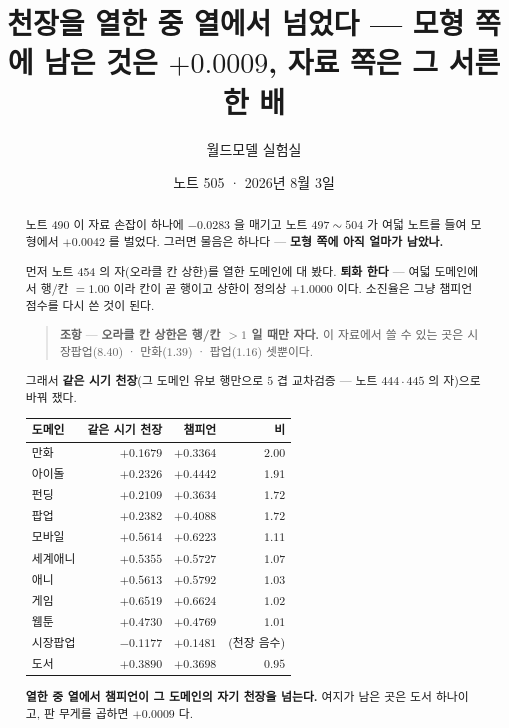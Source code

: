 \documentclass[11pt]{article}
\begin{document}
\title{천장을 열한 중 열에서 넘었다 --- 모형 쪽에 남은 것은 $+0.0009$, 자료 쪽은 그 서른한 배}
\author{월드모델 실험실}
\date{노트 505 · 2026년 8월 3일}
\maketitle

\begin{abstract}
노트 490 이 자료 손잡이 하나에 $-0.0283$ 을 매기고 노트 $497 \sim 504$ 가
여덟 노트를 들여 모형에서 $+0.0042$ 를 벌었다. 그러면 물음은 하나다 ---
\textbf{모형 쪽에 아직 얼마가 남았나.}

먼저 노트 454 의 자(오라클 칸 상한)를 열한 도메인에 대 봤다. \textbf{퇴화
한다} --- 여덟 도메인에서 행/칸 $= 1.00$ 이라 칸이 곧 행이고 상한이
정의상 $+1.0000$ 이다. 소진율은 그냥 챔피언 점수를 다시 쓴 것이 된다.

\begin{quote}
\textbf{조항} --- \textbf{오라클 칸 상한은 행/칸 $> 1$ 일 때만 자다.}
이 자료에서 쓸 수 있는 곳은 시장팝업($8.40$) · 만화($1.39$) ·
팝업($1.16$) 셋뿐이다.
\end{quote}

그래서 \textbf{같은 시기 천장}(그 도메인 유보 행만으로 $5$ 겹
교차검증 --- 노트 $444 \cdot 445$ 의 자)으로 바꿔 쟀다.

\begin{center}
\begin{tabular}{lrrr}
\hline
도메인 & 같은 시기 천장 & 챔피언 & 비 \\
\hline
만화 & $+0.1679$ & $+0.3364$ & $\mathbf{2.00}$ \\
아이돌 & $+0.2326$ & $+0.4442$ & $\mathbf{1.91}$ \\
펀딩 & $+0.2109$ & $+0.3634$ & $\mathbf{1.72}$ \\
팝업 & $+0.2382$ & $+0.4088$ & $\mathbf{1.72}$ \\
모바일 & $+0.5614$ & $+0.6223$ & $1.11$ \\
세계애니 & $+0.5355$ & $+0.5727$ & $1.07$ \\
애니 & $+0.5613$ & $+0.5792$ & $1.03$ \\
게임 & $+0.6519$ & $+0.6624$ & $1.02$ \\
웹툰 & $+0.4730$ & $+0.4769$ & $1.01$ \\
시장팝업 & $-0.1177$ & $+0.1481$ & (천장 음수) \\
\hline
도서 & $+0.3890$ & $+0.3698$ & $0.95$ \\
\hline
\end{tabular}
\end{center}

\textbf{열한 중 열에서 챔피언이 그 도메인의 자기 천장을 넘는다.} 여지가
남은 곳은 도서 하나이고, 판 무게를 곱하면 \textbf{$+0.0009$} 다.
\end{abstract}
\end{document}
